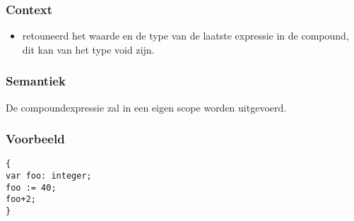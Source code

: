 \documentclass[]{article}
\begin{document}
\subsubsection{Context}
\begin{itemize}
\item retouneerd het waarde en de type van de laatste expressie in de compound, dit kan van het type void zijn.
\end{itemize}
\subsubsection{Semantiek}
De compoundexpressie zal in een eigen scope worden uitgevoerd.
\subsubsection{Voorbeeld}
\begin{lstlisting}[style=SELMA]
{
var foo: integer;
foo := 40;
foo+2;
}
\end{lstlisting}



%
%



%
%
%
\end{document}
